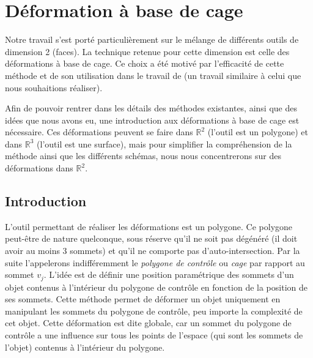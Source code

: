 

\chapter{Déformation à base de cage}

\graphicspath{ {Chapter2/Chapter2Figs/PNG/}
  {Chapter2/Chapter2Figs/PDF/} {Chapter2/Chapter2Figs/} }

Notre travail s'est porté particulièrement sur le mélange de différents outils
de dimension 2 (faces). La technique retenue pour cette dimension est celle des
déformations à base de cage. Ce choix a été motivé par l'efficacité de cette
méthode et de son utilisation dans le travail de \cite{GPCP13} (un travail
similaire à celui que nous souhaitions réaliser).

Afin de pouvoir rentrer dans les détails des méthodes existantes, ainsi que des
idées que nous avons eu, une introduction aux déformations à base de cage est
nécessaire. Ces déformations peuvent se faire dans $\mathbb{R}^2$ (l'outil est
un polygone) et dans $\mathbb{R}^3$ (l'outil est une surface), mais pour
simplifier la compréhension de la méthode ainsi que les différents schémas, nous
nous concentrerons sur des déformations dans $\mathbb{R}^2$.

\section{Introduction} 

L'outil permettant de réaliser les déformations est un polygone. Ce polygone
peut-être de nature quelconque, sous réserve qu'il ne soit pas dégénéré (il doit
avoir au moins 3 sommets) et qu'il ne comporte pas d'auto-intersection. Par la
suite l'appelerons indifféremment le \textit{polygone de contrôle} ou
\textit{cage} par rapport au sommet $v_j$. L'idée est de définir une position
paramétrique des sommets d'un objet contenus à l'intérieur du polygone de
contrôle en fonction de la position de ses sommets. Cette méthode permet de
déformer un objet uniquement en manipulant les sommets du polygone de contrôle,
peu importe la complexité de cet objet. Cette déformation est dite globale, car
un sommet du polygone de contrôle a une influence sur tous les points de
l'espace (qui sont les sommets de l'objet) contenus à l'intérieur du polygone.


